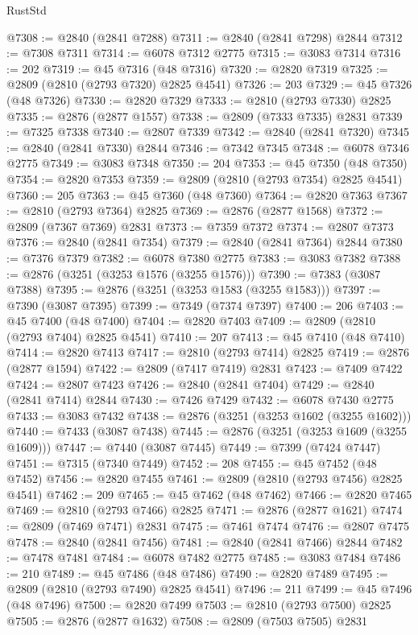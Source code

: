 \begin{lexlean}{RustStd}
\begin{coremodule}
@7308 := @2840 (@2841 @7288)
@7311 := @2840 (@2841 @7298) @2844
@7312 := @7308 @7311
@7314 := @6078 @7312 @2775
@7315 := @3083 @7314
@7316 := 202
@7319 := @45 @7316 (@48 @7316)
@7320 := @2820 @7319
@7325 := @2809 (@2810 (@2793 @7320) @2825 @4541)
@7326 := 203
@7329 := @45 @7326 (@48 @7326)
@7330 := @2820 @7329
@7333 := @2810 (@2793 @7330) @2825
@7335 := @2876 (@2877 @1557)
@7338 := @2809 (@7333 @7335) @2831
@7339 := @7325 @7338
@7340 := @2807 @7339
@7342 := @2840 (@2841 @7320)
@7345 := @2840 (@2841 @7330) @2844
@7346 := @7342 @7345
@7348 := @6078 @7346 @2775
@7349 := @3083 @7348
@7350 := 204
@7353 := @45 @7350 (@48 @7350)
@7354 := @2820 @7353
@7359 := @2809 (@2810 (@2793 @7354) @2825 @4541)
@7360 := 205
@7363 := @45 @7360 (@48 @7360)
@7364 := @2820 @7363
@7367 := @2810 (@2793 @7364) @2825
@7369 := @2876 (@2877 @1568)
@7372 := @2809 (@7367 @7369) @2831
@7373 := @7359 @7372
@7374 := @2807 @7373
@7376 := @2840 (@2841 @7354)
@7379 := @2840 (@2841 @7364) @2844
@7380 := @7376 @7379
@7382 := @6078 @7380 @2775
@7383 := @3083 @7382
@7388 := @2876 (@3251 (@3253 @1576 (@3255 @1576)))
@7390 := @7383 (@3087 @7388)
@7395 := @2876 (@3251 (@3253 @1583 (@3255 @1583)))
@7397 := @7390 (@3087 @7395)
@7399 := @7349 (@7374 @7397)
@7400 := 206
@7403 := @45 @7400 (@48 @7400)
@7404 := @2820 @7403
@7409 := @2809 (@2810 (@2793 @7404) @2825 @4541)
@7410 := 207
@7413 := @45 @7410 (@48 @7410)
@7414 := @2820 @7413
@7417 := @2810 (@2793 @7414) @2825
@7419 := @2876 (@2877 @1594)
@7422 := @2809 (@7417 @7419) @2831
@7423 := @7409 @7422
@7424 := @2807 @7423
@7426 := @2840 (@2841 @7404)
@7429 := @2840 (@2841 @7414) @2844
@7430 := @7426 @7429
@7432 := @6078 @7430 @2775
@7433 := @3083 @7432
@7438 := @2876 (@3251 (@3253 @1602 (@3255 @1602)))
@7440 := @7433 (@3087 @7438)
@7445 := @2876 (@3251 (@3253 @1609 (@3255 @1609)))
@7447 := @7440 (@3087 @7445)
@7449 := @7399 (@7424 @7447)
@7451 := @7315 (@7340 @7449)
@7452 := 208
@7455 := @45 @7452 (@48 @7452)
@7456 := @2820 @7455
@7461 := @2809 (@2810 (@2793 @7456) @2825 @4541)
@7462 := 209
@7465 := @45 @7462 (@48 @7462)
@7466 := @2820 @7465
@7469 := @2810 (@2793 @7466) @2825
@7471 := @2876 (@2877 @1621)
@7474 := @2809 (@7469 @7471) @2831
@7475 := @7461 @7474
@7476 := @2807 @7475
@7478 := @2840 (@2841 @7456)
@7481 := @2840 (@2841 @7466) @2844
@7482 := @7478 @7481
@7484 := @6078 @7482 @2775
@7485 := @3083 @7484
@7486 := 210
@7489 := @45 @7486 (@48 @7486)
@7490 := @2820 @7489
@7495 := @2809 (@2810 (@2793 @7490) @2825 @4541)
@7496 := 211
@7499 := @45 @7496 (@48 @7496)
@7500 := @2820 @7499
@7503 := @2810 (@2793 @7500) @2825
@7505 := @2876 (@2877 @1632)
@7508 := @2809 (@7503 @7505) @2831

\end{coremodule}
\end{lexlean}
